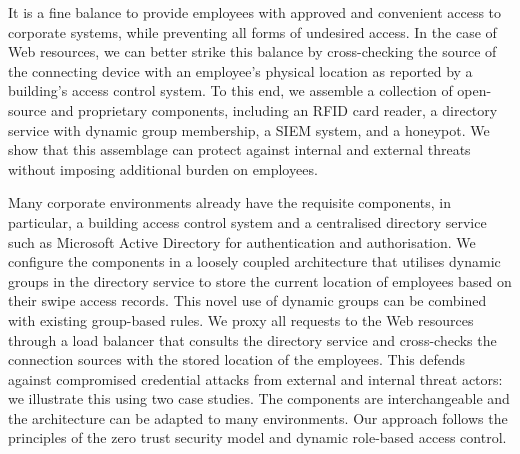 It is a fine balance to provide employees with approved and convenient
access to corporate systems, while preventing all forms of undesired
access.  In the case of Web resources, we can better strike this
balance by cross-checking the source of the connecting device with an
employee's physical location as reported by a building's access
control system.  To this end, we assemble a collection of open-source
and proprietary components, including an RFID card reader, a directory
service with dynamic group membership, a SIEM system, and a honeypot.
We show that this assemblage can protect against internal and external
threats without imposing additional burden on employees.

Many corporate environments already have the requisite components, in
particular, a building access control system and a centralised
directory service such as Microsoft Active Directory for
authentication and authorisation.  We configure the components in a
loosely coupled architecture that utilises dynamic groups in the
directory service to store the current location of employees based on
their swipe access records.  This novel use of dynamic groups can be
combined with existing group-based rules.  We proxy all requests to
the Web resources through a load balancer that consults the directory
service and cross-checks the connection sources with the stored
location of the employees.  This defends against compromised
credential attacks from external and internal threat actors: we
illustrate this using two case studies.  The components are
interchangeable and the architecture can be adapted to many
environments.  Our approach follows the principles of the zero trust
security model and dynamic role-based access control.
